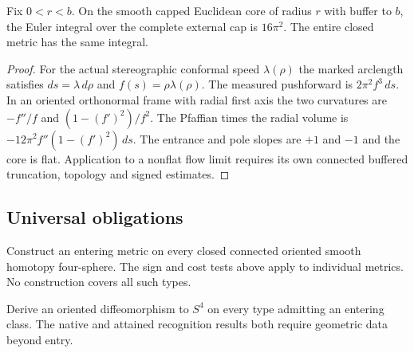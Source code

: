 \begin{proposition}
\label{prop:ed54-measured-cap}
\leanok
Fix $0<r<b$. On the smooth capped Euclidean core of radius $r$ with buffer to $b$, the Euler integral over the complete external cap is $16\pi^2$. The entire closed metric has the same integral.
\end{proposition}
\begin{proof}
\leanok
For the actual stereographic conformal speed $\lambda(\rho)$ the marked arclength satisfies $ds=\lambda\,d\rho$ and $f(s)=\rho\lambda(\rho)$. The measured pushforward is $2\pi^2 f^3\,ds$. In an oriented orthonormal frame with radial first axis the two curvatures are $-f''/f$ and $(1-(f')^2)/f^2$. The Pfaffian times the radial volume is $-12\pi^2 f''(1-(f')^2)\,ds$. The entrance and pole slopes are $+1$ and $-1$ and the core is flat. Application to a nonflat flow limit requires its own connected buffered truncation, topology and signed estimates.
\end{proof}

\subsection{Universal obligations}

\begin{openproblem}
\label{prob:ed07-universal-entry}
Construct an entering metric on every closed connected oriented smooth
homotopy four-sphere. The sign and cost tests above apply to individual
metrics. No construction covers all such types.
\end{openproblem}

\begin{openproblem}
\label{prob:ed07-entered-recognition}
Derive an oriented diffeomorphism to $S^4$ on every type admitting an
entering class. The native and attained recognition results both require
geometric data beyond entry.
\end{openproblem}

